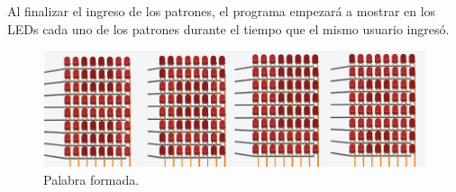 \documentclass{article}
\begin{document}
\begin{enumerate}
\newline 
Al finalizar el ingreso de los patrones, el programa empezará a mostrar en los LEDs cada uno de los patrones durante el tiempo que el mismo usuario ingresó. 

\newpage
\begin{figure}[h]
\includegraphics[scale=0.8]{palabra.png}
\centering
\caption{Palabra formada.}
\label{fig:palabra}
\end{figure}

\end{enumerate}
\end{document}
